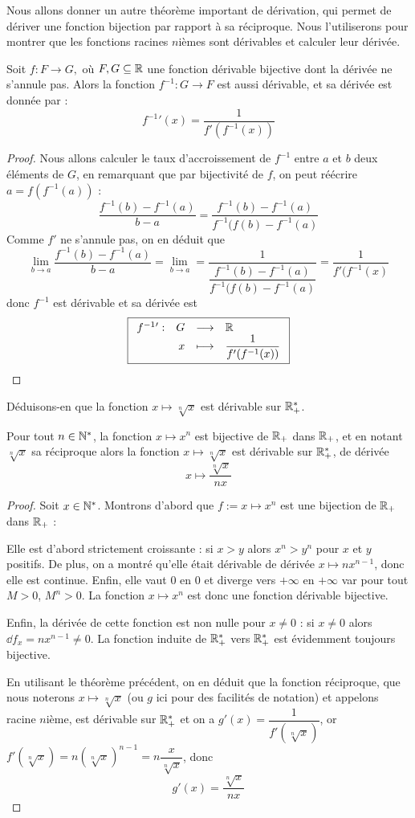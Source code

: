 Nous allons donner un autre théorème important de dérivation, qui permet de dériver une fonction bijection par rapport à sa réciproque. Nous l'utiliserons pour montrer que les fonctions racines $n$ièmes sont dérivables et calculer leur dérivée.

\begin{them}
    Soit $f : F\to G,$ où $ F,G\subseteq\mathbb{R}$ une fonction dérivable bijective dont la dérivée ne s'annule pas. Alors la fonction $f^{-1} : G \to F$ est aussi dérivable, et sa dérivée est donnée par : $$f^{-1} {}'(x) = \dfrac{1}{f'(f^{-1}(x))}$$
\end{them}

\begin{proof}
    Nous allons calculer le taux d'accroissement de $f^{-1}$ entre $a$ et $b$ deux éléments de $G$, en remarquant que par bijectivité de $f$, on peut réécrire $a = f(f^{-1}(a))$ : $$\dfrac{f^{-1}(b)-f^{-1}(a)}{b-a} = \dfrac{f^{-1}(b)-f^{-1}(a)}{f^{-1}(f(b)-f^{-1}(a)}$$
    Comme $f'$ ne s'annule pas, on en déduit que $$\lim_{b\to a} \dfrac{f^{-1}(b)-f^{-1}(a)}{b-a} = \lim_{b\to a} =\dfrac{1}{\dfrac{f^{-1}(b)-f^{-1}(a)}{f^{-1}(f(b)-f^{-1}(a)}} = \dfrac{1}{f'(f^{-1}(x)}$$ donc $f^{-1}$ est dérivable et sa dérivée est $$\boxed{\begin{array}[t]{lrcl} f^{-1}{}': & G & \longrightarrow & \mathbb{R} \\ & x & \longmapsto & \dfrac{1}{f'(f^{-1}(x))} \end{array}}$$
\end{proof}

Déduisons-en que la fonction $x\mapsto \sqrt[n]x$ est dérivable sur $\mathbb{R}_+^*$.

\begin{prop}
    Pour tout $n\in \mathbb{N}^*$, la fonction $x\mapsto x^n$ est bijective de $\mathbb{R}_+$ dans $\mathbb{R}_+$, et en notant $\sqrt[n]x$ sa réciproque alors la fonction $x\mapsto \sqrt[n]x$ est dérivable sur $\mathbb{R}_+^*$, de dérivée $$x\mapsto \dfrac{\sqrt[n]x}{nx}$$
\end{prop}

\begin{proof}
    Soit $x\in \mathbb{N}^*$. Montrons d'abord que $f := x\mapsto x^n$ est une bijection de $\mathbb{R}_+$ dans $\mathbb{R}_+$ :
    
    Elle est d'abord strictement croissante : si $x > y$ alors $x^n > y^n$ pour $x$ et $y$ positifs. De plus, on a montré qu'elle était dérivable de dérivée $x\mapsto nx^{n-1}$, donc elle est continue. Enfin, elle vaut $0$ en $0$ et diverge vers $+\infty$ en $+\infty$ var pour tout $M > 0$, $M^n > 0$. La fonction $x\mapsto x^n$ est donc une fonction dérivable bijective.

    Enfin, la dérivée de cette fonction est non nulle pour $x\neq 0$ : si $x\neq 0$ alors $\dd f_x = nx^{n-1} \neq 0$. La fonction induite de $\mathbb{R}_+^*$ vers $\mathbb{R}_+^*$ est évidemment toujours bijective.

    En utilisant le théorème précédent, on en déduit que la fonction réciproque, que nous noterons $x\mapsto \sqrt[n]x$ (ou $g$ ici pour des facilités de notation) et appelons racine $n$ième, est dérivable sur $\mathbb{R}_+^*$ et on a $g'(x) = \dfrac{1}{f'(\sqrt[n]x)}$, or $f'(\sqrt[n]x) = n(\sqrt[n]x)^{n-1} = n\dfrac{x}{\sqrt[n]x}$, donc $$\boxed{g'(x) = \dfrac{\sqrt[n]x}{nx}}$$
\end{proof}

